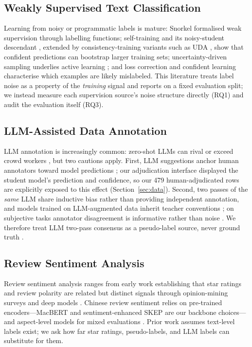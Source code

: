 \subsection{Weakly Supervised Text Classification}

Learning from noisy or programmatic labels is mature: Snorkel
\citep{ratner2017snorkel} formalised weak supervision through
labelling functions; self-training \citep{lee2013pseudo} and its
noisy-student descendant \citep{xie2020selftraining}, extended by
consistency-training variants such as UDA \citep{xie2020uda}, show
that confident predictions can bootstrap larger training sets;
uncertainty-driven sampling underlies active learning
\citep{settles2009}; and loss correction \citep{arazo2021pseudo} and
confident learning \citep{northcutt2021} characterise which examples
are likely mislabeled. This literature treats label noise as a
property of the \emph{training} signal and reports on a fixed
evaluation split; we instead measure each supervision source's noise
structure directly (RQ1) and audit the evaluation itself (RQ3).

\subsection{LLM-Assisted Data Annotation}

LLM annotation is increasingly common: zero-shot LLMs can rival or
exceed crowd workers \citep{gilardi2023}, but two cautions apply.
First, LLM suggestions anchor human annotators toward model
predictions \citep{schroeder2025humanloop}; our adjudication
interface displayed the student model's prediction and confidence,
so our 479 human-adjudicated rows are explicitly exposed to this
effect (Section~\ref{sec:data}). Second, two passes of the
\emph{same} LLM share inductive bias rather than providing
independent annotation, and models trained on LLM-augmented data
inherit teacher conventions \citep{moller2024parrot}; on subjective
tasks annotator disagreement is informative rather than noise
\citep{davani2022}. We therefore treat LLM two-pass consensus as a
pseudo-label source, never ground truth \citep{zenimoto2024,neveditsin2025}.

\subsection{Review Sentiment Analysis}

Review sentiment analysis ranges from early work establishing that
star ratings and review polarity are related but distinct signals
\citep{pang2005seeing} through opinion-mining surveys
\citep{pang2008opinion} and deep models \citep{zhang2018dl}. Chinese
review sentiment relies on pre-trained encoders---MacBERT
\citep{cui2020macbert} and sentiment-enhanced SKEP
\citep{tian2020skep} are our backbone choices---and aspect-level
models for mixed evaluations \citep{wang2016attention}. Prior work
assumes text-level labels exist; we ask how far star ratings,
pseudo-labels, and LLM labels can substitute for them.


